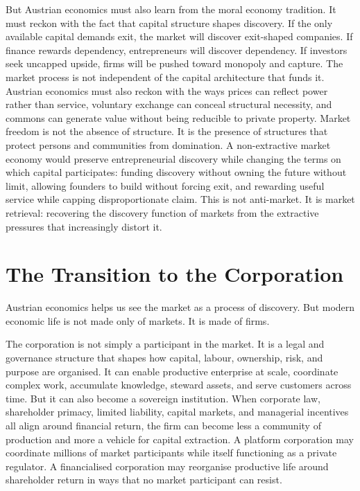 \documentclass[11pt,a4paper,oneside]{book}
\begin{document}
But Austrian economics must also learn from the moral economy tradition. It must reckon with the fact that capital structure shapes discovery. If the only available capital demands exit, the market will discover exit-shaped companies. If finance rewards dependency, entrepreneurs will discover dependency. If investors seek uncapped upside, firms will be pushed toward monopoly and capture. The market process is not independent of the capital architecture that funds it. Austrian economics must also reckon with the ways prices can reflect power rather than service, voluntary exchange can conceal structural necessity, and commons can generate value without being reducible to private property. Market freedom is not the absence of structure. It is the presence of structures that protect persons and communities from domination. A non-extractive market economy would preserve entrepreneurial discovery while changing the terms on which capital participates: funding discovery without owning the future without limit, allowing founders to build without forcing exit, and rewarding useful service while capping disproportionate claim. This is not anti-market. It is market retrieval: recovering the discovery function of markets from the extractive pressures that increasingly distort it.

\section*{The Transition to the Corporation}

Austrian economics helps us see the market as a process of discovery. But modern economic life is not made only of markets. It is made of firms.

The corporation is not simply a participant in the market. It is a legal and governance structure that shapes how capital, labour, ownership, risk, and purpose are organised. It can enable productive enterprise at scale, coordinate complex work, accumulate knowledge, steward assets, and serve customers across time. But it can also become a sovereign institution. When corporate law, shareholder primacy, limited liability, capital markets, and managerial incentives all align around financial return, the firm can become less a community of production and more a vehicle for capital extraction. A platform corporation may coordinate millions of market participants while itself functioning as a private regulator. A financialised corporation may reorganise productive life around shareholder return in ways that no market participant can resist.
\end{document}
